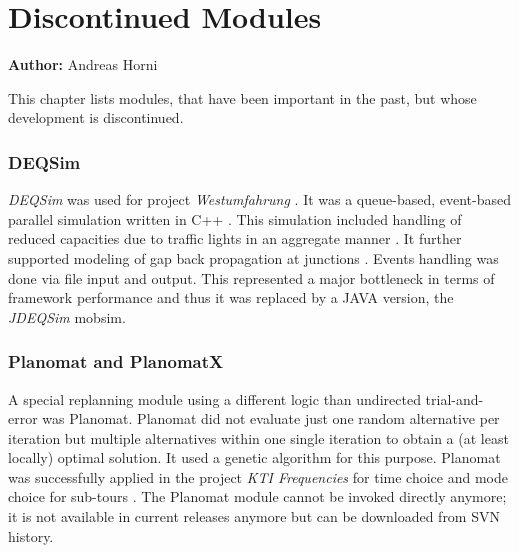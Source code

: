 \chapter{Discontinued Modules}
\label{ch:discontinued}

\hfill \textbf{Author:} Andreas Horni

This chapter lists modules, that have been important in the past, but whose development is discontinued.

\subsection{DEQSim}
\label{sec:deqsim}
\emph{DEQSim} was used for project \emph{Westumfahrung} \citep[][]{BalmerEtAl_ResRep_bdktzrh_2009}. It was a queue-based, event-based parallel simulation written in C++ \citep[][]{CharyparEtAl_TRR_2007, Charypar_PhDThesis_2008}. This simulation included handling of reduced capacities due to traffic lights in an aggregate manner \citep[][p.139 ff]{Charypar_PhDThesis_2008}. It further supported modeling of gap back propagation at junctions \citep[][p.98 ff]{Charypar_PhDThesis_2008}. Events handling was done via file input and output. This represented a major bottleneck in terms of framework performance and thus it was replaced by a JAVA version, the \emph{JDEQSim} mobsim.

\subsection{Planomat and PlanomatX}
\label{sec:planomat}
%
A special replanning module using a different logic than undirected trial-and-error was Planomat. Planomat did not evaluate just one random alternative per iteration but multiple alternatives within one single iteration to obtain a (at least locally) optimal solution. It used a genetic algorithm \citep[][]{MeisterEtAl_IATBR_2006, MeisterEtAl_STRC_2006, Meister_PhDThesis_2011} for this purpose. Planomat was successfully applied in the project \emph{KTI Frequencies} for time choice and mode choice for sub-tours \citep[][p.10]{BalmerEtAl_ResRep_datapuls_2010}. The Planomat module cannot be invoked directly anymore; it is not available in current releases anymore but can be downloaded from SVN history.

